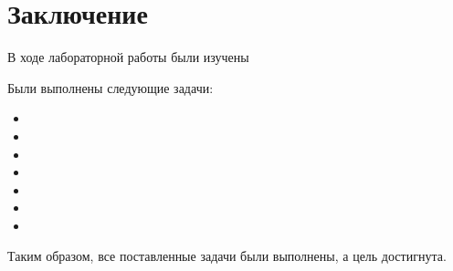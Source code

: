 \chapter*{Заключение}

В ходе лабораторной работы были изучены 

Были выполнены следующие задачи:
\begin{itemize}
    \item
    \item
    \item
    \item
    \item
    \item
    \item
\end{itemize}

Таким образом, все поставленные задачи были выполнены, а цель достигнута.

